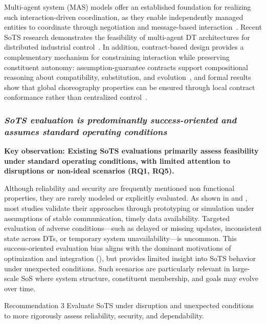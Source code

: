 Multi-agent system (MAS) models offer an established foundation for realizing such interaction-driven coordination, as they enable independently managed entities to coordinate through negotiation and message-based interaction~\cite{leite2013systematic}. Recent SoTS research demonstrates the feasibility of multi-agent DT architectures for distributed industrial control~\cite{jirsa2024use}. In addition, contract-based design provides a complementary mechanism for constraining interaction while preserving constituent autonomy: assumption-guarantee contracts support compositional reasoning about compatibility, substitution, and evolution~\cite{benveniste2012contracts}, and formal results show that global choreography properties can be ensured through local contract conformance rather than centralized control~\cite{bravetti2007towards}.

\subsubsection{\textit{SoTS evaluation is predominantly success-oriented and assumes standard operating conditions}}

\textbf{Key observation: Existing SoTS evaluations primarily assess feasibility under standard operating conditions, with limited attention to disruptions or non-ideal scenarios (RQ1, RQ5).}

Although reliability and security are frequently mentioned non functional properties, they are rarely modeled or explicitly evaluated. As shown in  and , most studies validate their approaches through prototyping or simulation under assumptions of stable communication, timely data availability. Targeted evaluation of adverse conditions---such as delayed or missing updates, inconsistent state across DTs, or temporary system unavailability---is uncommon. This success-oriented evaluation bias aligns with the dominant motivations of optimization and integration (), but provides limited insight into SoTS behavior under unexpected conditions. Such scenarios are particularly relevant in large-scale SoS where system structure, constituent membership, and goals may evolve over time.

\begin{recoframe}{Recommendation 3}
Evaluate SoTS under disruption and unexpected conditions to more rigorously assess reliability, security, and dependability.
\end{recoframe}

